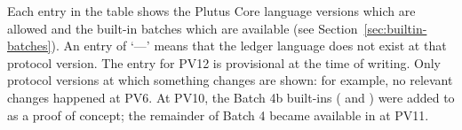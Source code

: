 \noindent Each entry in the table shows the Plutus Core language versions which
are allowed and the built-in batches which are available (see
Section~\ref{sec:builtin-batches}).  An entry of `---' means that the
ledger language does not exist at that protocol version.  The entry for PV12 is
provisional at the time of writing.  Only protocol versions at which something
changes are shown: for example, no relevant changes happened at PV6.  At PV10,
the Batch 4b built-ins ( and )
were added to  as a proof of concept; the remainder of Batch 4
became available in  at PV11.
